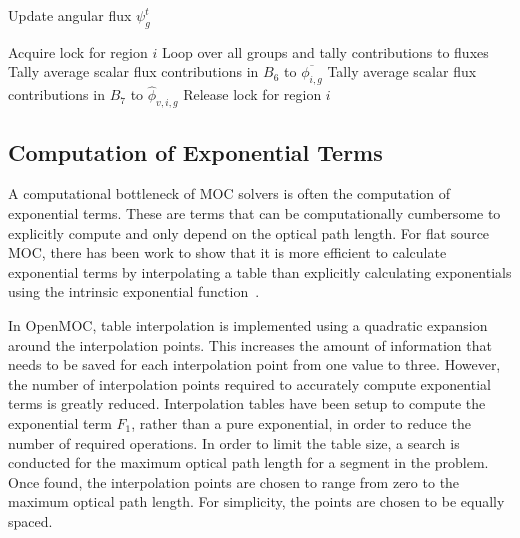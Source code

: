 \begin{algorithm*}[!h]
\begin{algorithmic}
		\State Update angular flux $\psi_g^{t}$ 

		\EndFor
		\vspace{0.1in}
		
		\State Acquire lock for region $i$
		 \Comment Loop over all groups and tally contributions to fluxes
		\vspace{0.1in}
		\State Tally average scalar flux contributions in $B_6$ to $\overline{\phi_{i,g}}$ 
		\State Tally average scalar flux contributions in $B_7$ to $\hat{\phi}_{v,i,g}$ 
		\vspace{0.1in}
		\EndFor
		\vspace{0.1in}
		\State Release lock for region $i$
		
	\end{algorithmic}
\end{algorithm*}

\clearpage
\subsection{Computation of Exponential Terms}
\label{sec:ls-exponential}

A computational bottleneck of \ac{MOC} solvers is often the computation of exponential terms. These are terms that can be computationally cumbersome to explicitly compute and only depend on the optical path length. For flat source \ac{MOC}, there has been work to show that it is more efficient to calculate exponential terms by interpolating a table than explicitly calculating exponentials using the intrinsic exponential function~\cite{boyd2014openmoc}. 

In OpenMOC, table interpolation is implemented using a quadratic expansion around the interpolation points. This increases the amount of information that needs to be saved for each interpolation point from one value to three. However, the number of interpolation points required to accurately compute exponential terms is greatly reduced. Interpolation tables have been setup to compute the exponential term $F_1$, rather than a pure exponential, in order to reduce the number of required operations. In order to limit the table size, a search is conducted for the maximum optical path length for a segment in the problem. Once found, the interpolation points are chosen to range from zero to the maximum optical path length. For simplicity, the points are chosen to be equally spaced.

